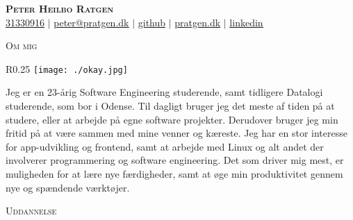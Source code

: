 \documentclass[11pt]{article}
\begin{document}
\begin{center}
  \textbf{\huge{\scshape{Peter Heilbo Ratgen}}}\\ 
  \vspace{0.2cm}
  \small \href{tel:+4531330916}{31330916} $|$
  \href{mailto:peter@pratgen.dk}{\underline{peter@pratgen.dk}} $|$
  \href{https://github.com/PeterRatgen }{\underline{github}} $|$
  \href{https://pratgen.dk}{\underline{pratgen.dk}} $|$
  \href{https://www.linkedin.com/in/peter-ratgen-a1236529/}{\underline{linkedin}}
\end{center}

\noindent\large{\scshape{Om mig}} \newline
\noindent{\rule[0.3cm]{\textwidth}{0.4pt}}

\begin{wrapfigure}{R}{0.25\textwidth}
  \vspace{-0.7cm}
  \texttt{[image: ./okay.jpg]}
\end{wrapfigure}
\normalsize Jeg er en 23-årig Software Engineering studerende, samt tidligere
Datalogi studerende, som bor i Odense. Til dagligt bruger jeg det meste af tiden
på at studere, eller at arbejde på egne software projekter. Derudover bruger jeg
min fritid på at være sammen med mine venner og kæreste. Jeg har en stor
interesse for app-udvikling og frontend, samt at arbejde med Linux og alt andet
der involverer programmering og software engineering. Det som driver mig mest,
er muligheden for at lære nye færdigheder, samt at øge min produktivitet gennem
nye og spændende værktøjer.

\vspace{0.3cm}
\noindent\large{\scshape{Uddannelse}} \newline
\noindent{\rule[0.3cm]{\textwidth}{0.4pt}}
\end{document}
